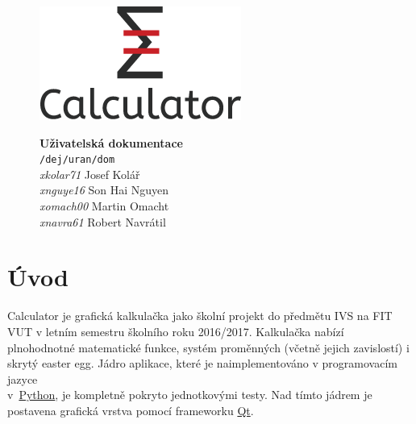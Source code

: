 \documentclass[a4paper, 11pt]{article}
\begin{document}
\thispagestyle{empty}

\begin{figure}[H]
    \centering
    \includegraphics[width=.5\textwidth]{logo.png}
    \vspace{32pt}

    {\Huge{\textbf{Uživatelská dokumentace}}}\\
    \vspace{20pt}
    \texttt{/dej/uran/dom}\\
    \textit{xkolar71} Josef Kolář\\
    \textit{xnguye16} Son Hai Nguyen\\
    \textit{xomach00} Martin Omacht\\
    \textit{xnavra61} Robert Navrátil
\end{figure}

\hypersetup{
    colorlinks=true,
    linktoc=all
}

{\hypersetup{linkcolor=black}
\tableofcontents
}


\newpage

\pagestyle{fancy}

\section{Úvod}\label{uvod}

Calculator je grafická kalkulačka jako školní projekt do předmětu IVS na FIT VUT v letním semestru školního roku 2016/2017. Kalkulačka nabízí plnohodnotné matematické funkce, systém proměnných (včetně jejich zavislostí) i skrytý easter egg. Jádro aplikace, které je naimplementováno v programovacím jazyce \\v~\href{https://www.python.org/}{Python}, je kompletně pokryto jednotkovými testy. Nad tímto jádrem je postavena grafická vrstva pomocí frameworku \href{https://www.qt.io/}{Qt}.
\end{document}
